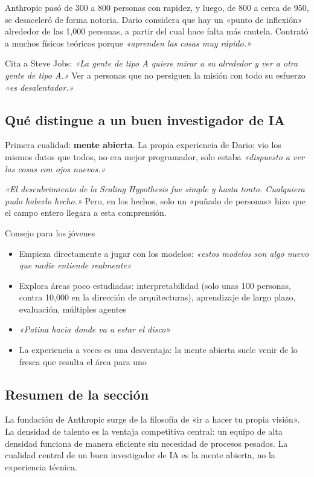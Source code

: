 \documentclass[a4paper]{article}
\begin{document}
Anthropic pasó de 300 a 800 personas con rapidez, y luego, de 800 a cerca de 950, se desaceleró de forma notoria. Dario considera que hay un «punto de inflexión» alrededor de las 1,000 personas, a partir del cual hace falta más cautela. Contrató a muchos físicos teóricos porque \textit{«aprenden las cosas muy rápido.»}

Cita a Steve Jobs: \textit{«La gente de tipo A quiere mirar a su alrededor y ver a otra gente de tipo A.»} Ver a personas que no persiguen la misión con todo su esfuerzo \textit{«es desalentador.»}

\subsection{Qué distingue a un buen investigador de IA}

Primera cualidad: \textbf{mente abierta}. La propia experiencia de Dario: vio los mismos datos que todos, no era mejor programador, solo estaba \textit{«dispuesto a ver las cosas con ojos nuevos.»}

\textit{«El descubrimiento de la Scaling Hypothesis fue simple y hasta tonto. Cualquiera pudo haberlo hecho.»} Pero, en los hechos, solo un «puñado de personas» hizo que el campo entero llegara a esta comprensión.

\begin{knowledgebox}{Consejo para los jóvenes}
\begin{itemize}
    \item Empieza directamente a jugar con los modelos: \textit{«estos modelos son algo nuevo que nadie entiende realmente»}
    \item Explora áreas poco estudiadas: interpretabilidad (solo unas 100 personas, contra 10,000 en la dirección de arquitecturas), aprendizaje de largo plazo, evaluación, múltiples agentes
    \item \textit{«Patina hacia donde va a estar el disco»}
    \item La experiencia a veces es una desventaja: la mente abierta suele venir de lo fresca que resulta el área para uno
\end{itemize}
\end{knowledgebox}

\subsection{Resumen de la sección}

La fundación de Anthropic surge de la filosofía de «ir a hacer tu propia visión». La densidad de talento es la ventaja competitiva central: un equipo de alta densidad funciona de manera eficiente sin necesidad de procesos pesados. La cualidad central de un buen investigador de IA es la mente abierta, no la experiencia técnica.
\end{document}
